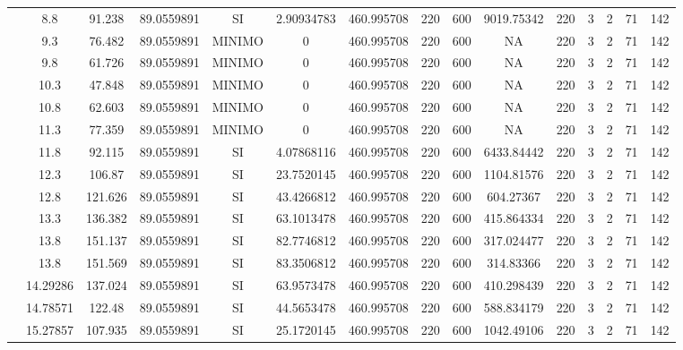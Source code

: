 \begin{table}[H]
{\begin{tabular}{|c|c|c|c|c|c|c|c|c|c|c|c|c|c|c|}
\cline{2-15}    & 8.8 & 91.238 & 89.0559891 & SI  & 2.90934783 & 460.995708 & 220 & 600 & 9019.75342 & 220 & 3   & 2   & 71  & 142 \bigstrut\\
\cline{2-15}    & 9.3 & 76.482 & 89.0559891 & MINIMO & 0   & 460.995708 & 220 & 600 & NA  & 220 & 3   & 2   & 71  & 142 \bigstrut\\
\cline{2-15}    & 9.8 & 61.726 & 89.0559891 & MINIMO & 0   & 460.995708 & 220 & 600 & NA  & 220 & 3   & 2   & 71  & 142 \bigstrut\\
\cline{2-15}    & 10.3 & 47.848 & 89.0559891 & MINIMO & 0   & 460.995708 & 220 & 600 & NA  & 220 & 3   & 2   & 71  & 142 \bigstrut\\
\cline{2-15}    & 10.8 & 62.603 & 89.0559891 & MINIMO & 0   & 460.995708 & 220 & 600 & NA  & 220 & 3   & 2   & 71  & 142 \bigstrut\\
\cline{2-15}    & 11.3 & 77.359 & 89.0559891 & MINIMO & 0   & 460.995708 & 220 & 600 & NA  & 220 & 3   & 2   & 71  & 142 \bigstrut\\
\cline{2-15}    & 11.8 & 92.115 & 89.0559891 & SI  & 4.07868116 & 460.995708 & 220 & 600 & 6433.84442 & 220 & 3   & 2   & 71  & 142 \bigstrut\\
\cline{2-15}    & 12.3 & 106.87 & 89.0559891 & SI  & 23.7520145 & 460.995708 & 220 & 600 & 1104.81576 & 220 & 3   & 2   & 71  & 142 \bigstrut\\
\cline{2-15}    & 12.8 & 121.626 & 89.0559891 & SI  & 43.4266812 & 460.995708 & 220 & 600 & 604.27367 & 220 & 3   & 2   & 71  & 142 \bigstrut\\
\cline{2-15}    & 13.3 & 136.382 & 89.0559891 & SI  & 63.1013478 & 460.995708 & 220 & 600 & 415.864334 & 220 & 3   & 2   & 71  & 142 \bigstrut\\
\cline{2-15}    & 13.8 & 151.137 & 89.0559891 & SI  & 82.7746812 & 460.995708 & 220 & 600 & 317.024477 & 220 & 3   & 2   & 71  & 142 \bigstrut\\
\cline{2-15}    & 13.8 & 151.569 & 89.0559891 & SI  & 83.3506812 & 460.995708 & 220 & 600 & 314.83366 & 220 & 3   & 2   & 71  & 142 \bigstrut\\
\cline{2-15}    & 14.29286 & 137.024 & 89.0559891 & SI  & 63.9573478 & 460.995708 & 220 & 600 & 410.298439 & 220 & 3   & 2   & 71  & 142 \bigstrut\\
\cline{2-15}    & 14.78571 & 122.48 & 89.0559891 & SI  & 44.5653478 & 460.995708 & 220 & 600 & 588.834179 & 220 & 3   & 2   & 71  & 142 \bigstrut\\
\cline{2-15}    & 15.27857 & 107.935 & 89.0559891 & SI  & 25.1720145 & 460.995708 & 220 & 600 & 1042.49106 & 220 & 3   & 2   & 71  & 142 \bigstrut\\

\end{tabular}}
\end{table}
